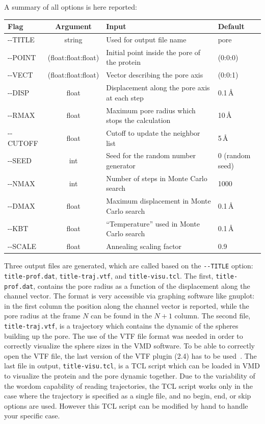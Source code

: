\documentclass[11pt,twoside,onecolumn,a4paper,openright,notitlepage]{book}[2001/04/21]
\begin{document}
\clearpage
A summary of all options is here reported:
\begin{longtable}{l|c|p{5.0cm}|l}
\bf{Flag} & \bf{Argument} & \bf{Input} & \bf{Default}\\
\hline\endhead
-{}-TITLE    & string              & Used for output file name                       & pore \\
-{}-POINT    & (float:float:float) & Initial point inside the pore of the protein    & (0:0:0) \\
-{}-VECT     & (float:float:float) & Vector describing the pore axis                 & (0:0:1) \\
-{}-DISP     & float               & Displacement along the pore axis at each step   & 0.1\,\AA\\
-{}-RMAX     & float               & Maximum pore radius which stops the calculation & 10\,\AA\\
-{}-CUTOFF   & float               & Cutoff to update the neighbor list              & 5\,\AA\\
-{}-SEED     & int                 & Seed for the random number generator            & 0 (random seed)\\
-{}-NMAX     & int                 & Number of steps in Monte Carlo search           & 1000\\
-{}-DMAX     & float               & Maximum displacement in Monte Carlo search      & 0.1\,\AA\\
-{}-KBT      & float               & ``Temperature'' used in Monte Carlo search      & 0.1\,\AA\\
-{}-SCALE    & float               & Annealing scaling factor                        & 0.9\\
\end{longtable}

Three output files are generated, which are called based on the \verb#--TITLE# option: \verb#title-prof.dat#, \verb#title-traj.vtf#, and \verb#title-visu.tcl#. The first, \verb#title-prof.dat#, contains the pore radius as a function of the displacement along the channel vector. The format is very accessible via graphing software like gnuplot: in the first column the position along the channel vector is reported, while the pore radius at the frame $N$ can be found in the $N+1$ column. The second file, \verb#title-traj.vtf#, is a trajectory which contains the dynamic of the spheres building up the pore. The use of the VTF file format was needed in order to correctly visualize the sphere sizes in the VMD software. To be able to correctly open the VTF file, the last version of the VTF plugin (2.4) has to be used~\cite{vtfplugin}. The last file in output, \verb#title-visu.tcl#, is a TCL script which can be loaded in VMD to visualize the protein and the pore dynamic together. Due to the variability of the wordom capability of reading trajectories, the TCL script works only in the case where the trajectory is specified as a single file, and no begin, end, or skip options are used. However this TCL script can be modified by hand to handle your specific case. 
\end{document}
